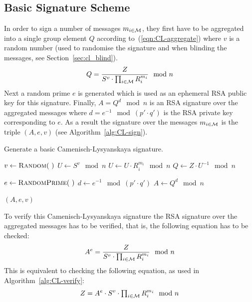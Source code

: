 \subsection{Basic Signature Scheme}\label{sec:cl_basic}

In order to sign a number of messages $m_{i \in \mathcal{M}}$, they first have to be
aggregated into a single group element $Q$ according to~(\ref{eqn:CL-aggregate})
where $v$ is a random number (used to randomise the signature and when blinding
the messages, see Section~\ref{sec:cl_blind}).
\begin{equation}\label{eqn:CL-aggregate}
  Q = \dfrac{Z}{S^v \cdot \prod_{i \in \mathcal{M}} R_i^{m_i}} \mod n
\end{equation}
Next a random prime $e$ is generated which is used as an ephemeral RSA public
key for this signature. Finally, $A = Q^d \mod n$ is an RSA signature over the
aggregated messages where $d = e^{-1} \mod (p' \cdot q')$ is the RSA private
key corresponding to $e$. As a result the signature over the messages
$m_{i \in \mathcal{M}}$ is the triple $(A, e, v)$ (see Algorithm~\ref{alg:CL-sign}).

\begin{algorithm}
  \caption{Generate a basic Camenisch-Lysyanskaya signature.}
  \label{alg:CL-sign}
  \addtolength{\baselineskip}{1mm}
  \begin{algorithmic}[1]
      \State $v \gets \Call{Random}{~}$
      \State $U \gets S^v \mod n$
        \State $U \gets U \cdot R_i^{m_i} \mod n$
      \EndFor
      \State $Q \gets Z \cdot U^{-1} \mod n$

      \State $e \gets \Call{RandomPrime}{~}$
      \State $d \gets e^{-1} \mod (p' \cdot q')$
      \State $A \gets Q^d \mod n$

      \Return $(A, e, v)$
    \EndFunction
  \end{algorithmic}
\end{algorithm}

To verify this Camenisch-Lysyanskaya signature the RSA signature over the
aggregated messages has to be verified, that is, the following equation has to
be checked:
\begin{equation}\label{eqn:CL-verify}
  A^e = \dfrac{Z}{S^v \cdot \prod_{i \in \mathcal{M}} R_i^{m_i}} \mod n
\end{equation}
This is equivalent to checking the following equation, as used in
Algorithm~\ref{alg:CL-verify}:
\begin{equation}\label{eqn:CL-verify-Z}
  Z = A^e \cdot S^v \cdot \textstyle\prod_{i \in \mathcal{M}} R_i^{m_i} \mod n
\end{equation}

